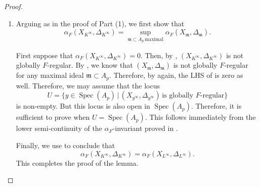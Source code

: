 \documentclass[11pt,reqno]{amsart}
\newcommand{\Q}{\mathbb{Q}}
\newcommand{\fm}{\mathfrak{m}}
\newcommand{\bF}{\mathbb{F}}
\DeclareMathOperator{\Spec}{Spec}
\numberwithin{equation}{section}
\theoremstyle{definition}
\newcommand{\FA}{\alpha_{F}}
\newcommand{\s}{\mathscr{s}}
\begin{document}
\begin{proof}
\begin{enumerate}
For the reverse inequality, we use \cite[Theorem 4.10]{CRSTBertiniTheorems} to see that for any $0 < \lambda < \s(X_{K^{\infty}}, \Delta_{K^\infty})$, there exists a dense open set $U_{\lambda} \subset \Spec(A_p)$ such that for any maximal ideal $\fm \in U_{\lambda}$, we have $\s(X_{\fm}, \Delta_{\fm}) > \lambda$. Then, the reverse inequality follows by taking $\lambda \to \s(X_{L^{\infty}}, \Delta_{L^\infty}).$ This completes the proof of the claim.

Now, to prove Part (1) of the lemma using the above claim, it suffices to show that $\s(X_K, \Delta_K) = \s(X_L, \Delta_L)$. But this follows again from \cite[Theorem 3.6]{CRSTBertiniTheorems}.

\item Arguing as in the proof of Part (1), we first show that
\begin{equation} \label{supequalsgeneric3} \FA(X_{K^\infty}, \Delta_{K^\infty}) =  \sup_{ \fm \subset A_p \,  \text{maximal} } \FA(X_{\fm}, \Delta_\fm) . \end{equation}

First suppose that $\FA(X_{K^\infty}, \Delta_{K^\infty}) = 0$. Then, by \cite[Theorem~3.10]{PandeFrobeniusAlpha}, $(X_{K^\infty}, \Delta_{K^\infty})$ is not globally $F$-regular. By , we know that $(X_\fm, \Delta_\fm)$ is not globally $F$-regular for any maximal ideal $\fm \subset A_p$. Therefore, by \cite[Theorem~3.10]{PandeFrobeniusAlpha} again, the LHS of  is zero as well. Therefore, we may assume that the locus
\[ U = \{ y \in \Spec(A_p) \, | \, (X_{y^\infty}, \Delta_{y^\infty}) \, \text{is globally $F$-regular} \} \]
is non-empty. But this locus is also open in $\Spec(A_p)$. Therefore, it is sufficient to prove   when $U = \Spec(A_p)$. This follows immediately from the lower semi-continuity of the $\FA$-invariant proved in \cite[Theorem~V.2.1]{Pandethesis}.

Finally, we use \cite[Corollary 4.14]{PandeFrobeniusAlpha} to conclude that
\[ \FA(X_{K^\infty}, \Delta_{K^\infty}) = \FA(X_{L^\infty}, \Delta_{L^\infty}). \]
This completes the proof of the lemma. \qedhere
\end{enumerate}
\end{proof}
\end{document}
